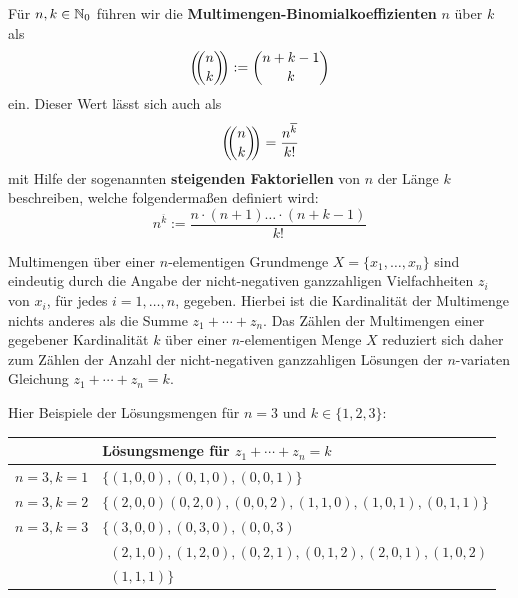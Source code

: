 \begin{defn}
		Für $n,k \in \mathbb{N}_0$ führen wir die \textbf{Multimengen-Binomialkoeffizienten} $n$ über $k$ als 
		\[
			\left(\!\!\binom{n}{k}\!\!\right) := \binom{n+k-1}{k}
		\] ein. Dieser Wert lässt sich auch als 
		\[
			\left(\!\!\binom{n}{k}\!\!\right) =\frac{ n^{\overline{k}}}{k!}
		\]
		mit Hilfe der sogenannten \textbf{steigenden Faktoriellen} von $n$ der Länge $k$ beschreiben, welche folgendermaßen definiert wird: 
		\[
				n^{\overline{k}} := \frac{n \cdot (n+1) \ldots \cdot (n+k-1)}{k!}
		\]
\end{defn} 

\begin{bem}
 	Multimengen über einer $n$-elementigen Grundmenge $X = \{x_1,\ldots,x_n\}$ sind eindeutig durch die Angabe der nicht-negativen ganzzahligen Vielfachheiten $z_i$ von $x_i$, für jedes $i=1,\ldots,n$, gegeben. Hierbei ist die Kardinalität der Multimenge nichts anderes als die Summe $z_1 + \cdots + z_n$. Das Zählen der Multimengen einer gegebener Kardinalität $k$ über einer $n$-elementigen Menge $X$  reduziert sich daher zum Zählen der Anzahl der nicht-negativen ganzzahligen Lösungen der $n$-variaten Gleichung $z_1 + \cdots + z_n = k$. 
 	
 	Hier Beispiele der Lösungsmengen für $n=3$ und $k \in \{1,2,3\}$: 
 	\begin{center} 
 	\begin{tabular}{l|l}
 			& Lösungsmenge für $z_1 + \cdots + z_n =k$ 
 			\\ \hline 
 		$n=3, k=1$ & $\{(1,0,0), (0,1,0), (0,0,1)\}$ 
 		\\ $n=3, k=2$ & $\{(2,0,0)(0,2,0),(0,0,2), (1,1,0),(1,0,1), (0,1,1)\}$
 		\\ $n=3, k=3$ & $\{(3,0,0),(0,3,0),(0,0,3)$
 		\\ & $\phantom{\{}(2,1,0),(1,2,0),(0,2,1),(0,1,2),(2,0,1),(1,0,2)$
 		\\ & $\phantom{\{} (1,1,1)\}$
 	\end{tabular} 
 	\end{center} 
\end{bem} 

